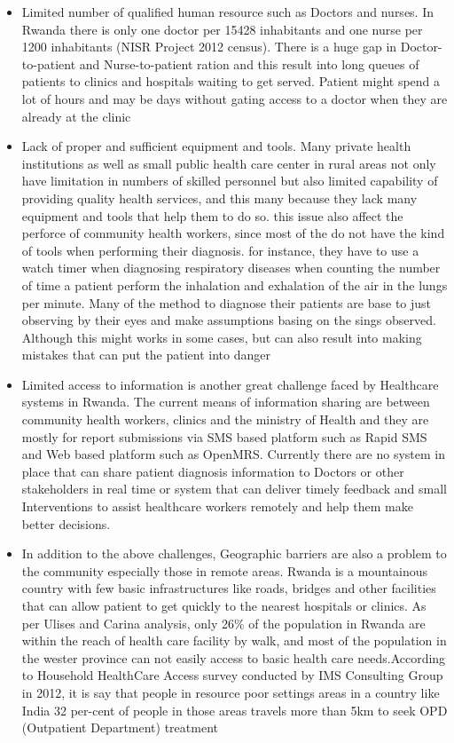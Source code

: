 \begin{itemize}
	\item Limited number of qualified human resource such as Doctors and nurses. In Rwanda there is only one doctor per 15428 inhabitants and one nurse per 1200 inhabitants (NISR Project 2012 census). There is a huge gap in Doctor-to-patient and Nurse-to-patient ration and this result into long queues of patients to clinics and hospitals waiting to get served. Patient might spend a lot of hours and may be days without gating access to a doctor when they are already at the clinic
	\item Lack of proper and sufficient equipment and tools. Many private health institutions as well as small public health care center in rural areas not only have limitation in numbers of skilled personnel but also limited capability of providing quality health services, and this many because they lack many equipment and tools that help them to do so. this issue also affect the perforce of community health workers, since most of the do not have the kind of tools when performing their diagnosis. for instance, they have to use a watch timer when diagnosing respiratory diseases when counting the number of time a patient perform the inhalation and exhalation of the air in the lungs per minute. Many of the method to diagnose their patients are base to just observing by their eyes and make assumptions basing on the sings observed. Although this might works in some cases, but can also result into making mistakes that can put the patient into danger
	\item Limited access to information is another great challenge faced by Healthcare systems in Rwanda. The current means of information sharing are between community health workers, clinics and the ministry of Health and they are mostly for report submissions via SMS based platform such as Rapid SMS and Web based platform such as OpenMRS. Currently there are no system in place that can share patient diagnosis information to Doctors or other stakeholders in real time or system that can deliver timely feedback and small Interventions to assist healthcare workers remotely and help them make better decisions.
	\item In addition to the above challenges, Geographic barriers are also a problem to the community especially those in remote areas. Rwanda is a mountainous country with few basic infrastructures like roads, bridges and other facilities that can allow patient to get quickly to the nearest hospitals or clinics. As per Ulises and Carina analysis, only 26\% of the population in Rwanda are within the reach of health care facility by walk, and most of the population in the wester province can not easily access to basic health care needs\cite{munoz2012geographical}.According to Household HealthCare Access survey conducted by IMS Consulting Group in 2012, it is say that people in resource poor settings areas in a country like India 32 per-cent of people in those areas travels more than 5km to seek OPD (Outpatient Department) treatment
\end{itemize}


